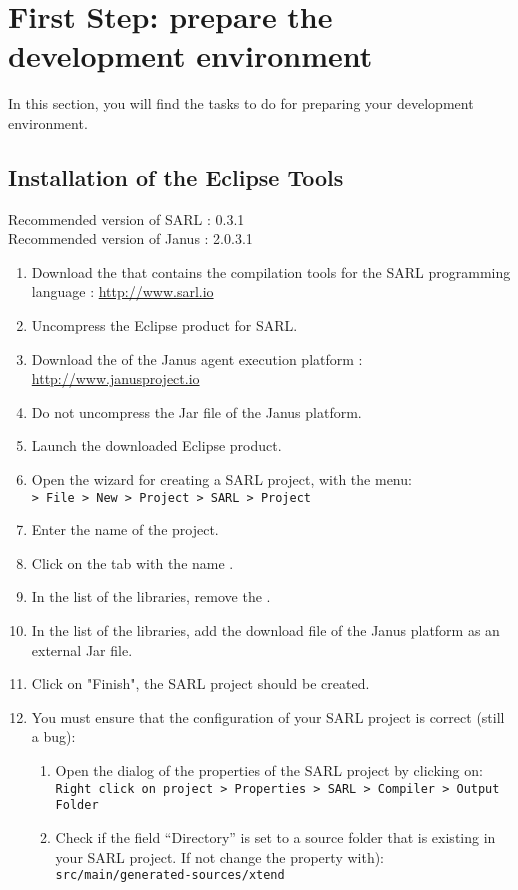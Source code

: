 \section{First Step: prepare the development environment}

In this section, you will find the tasks to do for preparing your development environment.

\subsection{Installation of the Eclipse Tools}

\begin{emphbox}
Recommended version of SARL : 0.3.1 \\
Recommended version of Janus : 2.0.3.1
\end{emphbox}

\begin{enumerate}
\item Download the  that contains the compilation tools for the SARL programming language : \url{http://www.sarl.io}
\item Uncompress the Eclipse product for SARL.
\item Download the  of the Janus agent execution platform : \url{http://www.janusproject.io}
\item Do not uncompress the Jar file of the Janus platform.
\item Launch the downloaded Eclipse product.
\item Open the wizard for creating a SARL project, with the menu: \\
	\texttt{> File > New > Project > SARL > Project}
\item Enter the name of the project.
\item Click on the tab with the name .
\item In the list of the libraries, remove the .
\item In the list of the libraries, add the download file of the Janus platform as an external Jar file.
\item Click on "Finish", the SARL project should be created.
\item You must ensure that the configuration of your SARL project is correct (still a bug):
	\begin{enumerate}[a]
	\item Open the dialog of the properties of the SARL project by clicking on: \\
		\texttt{Right click on project > Properties > SARL > Compiler > Output Folder}
	\item Check if the field ``Directory'' is set to a source folder that is existing in your SARL project. If not change the property with): \\
		\texttt{src/main/generated-sources/xtend}
	\end{enumerate}
\end{enumerate}

